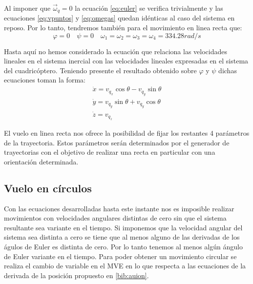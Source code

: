 \documentclass[main]{subfiles}
\begin{document}
Al imponer que $\vec{\omega}_q=0$ la ecuaci\'on \ref{eq:euler} se verifica trivialmente y las ecuaciones \ref{eq:vpuntos} y \ref{eq:omegas} quedan id\'enticas al caso del sistema en reposo. Por lo tanto, tendremos tambi\'en para el movimiento en linea recta que:
\begin{equation}
\varphi=0 \quad \psi=0 \quad \omega_1=\omega_2=\omega_3=\omega_4 = 334.28 rad/s
\end{equation}

Hasta aqu\'i no hemos considerado la ecuaci\'on que relaciona las velocidades lineales en el sistema inercial con las velocidades lineales expresadas en el sistema del cuadric\'optero. Teniendo presente el resultado obtenido sobre $\varphi$ y $\psi$ dichas ecuaciones toman la forma:
\begin{equation}\begin{array}{c}
\dot{x}=v_{q_x}\cos\theta-v_{q_y}\sin\theta\\
\dot{y}=v_{q_y}\sin\theta+v_{q_y}\cos\theta\\
\dot{z}=v_{q_z}
\end{array}
\end{equation} 

El vuelo en linea recta nos ofrece la posibilidad de fijar los restantes 4 par\'ametros de la trayectoria. Estos par\'ametros ser\'an determinados por el generador de trayectorias con el objetivo de realizar una recta en particular con una orientaci\'on determinada. 

\subsection{Vuelo en c\'irculos}

Con las ecuaciones desarrolladas hasta este instante nos es imposible realizar movimientos con velocidades angulares distintas de cero sin que el sistema resultante sea variante en el tiempo. Si imponemos que la velocidad angular del sistema sea distinta a cero se tiene que al menos alguno de las derivadas de los \'agulos de Euler es distinta de cero. Por lo tanto tenemos al menos alg\'un \'angulo de Euler variante en el tiempo. Para poder obtener un movimiento circular se realiza el cambio de variable en el MVE en lo que respecta a las ecuaciones de la derivada de la posici\'on propuesto en \ref{bib:auion}. \\
\end{document}
